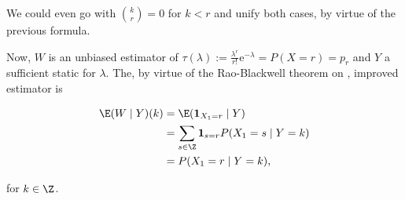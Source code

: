 \begin{solution}
\begin{enumerate}[label = (\alph*)]
\begin{enumerate}[label = \arabic*.]
    \end{enumerate}

    We could even go with $\binom{k}{r} = 0$ for $k < r$ and unify both cases, by virtue of the previous formula.

    Now, $W$ is an unbiased estimator of $\tau(\lambda) := \frac{\lambda^r}{r!} \mathrm e^{-\lambda} = P(X = r) = p_r$ and $Y$ a sufficient static for $\lambda$.
    The, by virtue of the Rao-Blackwell theorem on \cite[lecture 8, slide 37]{EStat}, improved estimator is

    \begin{align*}
        \E(W \mid Y)(k)
        & =
        \E(\mathbf 1_{X_1 = r} \mid Y) \\
        & =
        \sum_{s \in \Z}
            \mathbf 1_{s = r}
            P(X_1 = s \mid Y = k) \\
        & =
        P(X_1 = r \mid Y = k),
    \end{align*}

    for $k \in \Z$.

\end{enumerate}

\end{solution}

